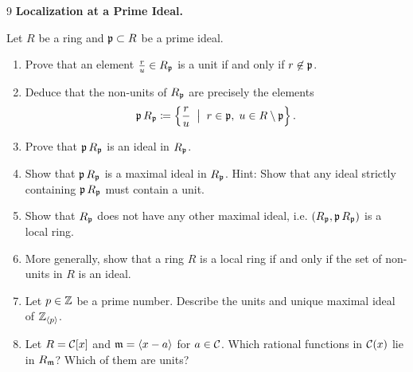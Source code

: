 \documentclass[Notebook.tex]{subfiles}
\begin{document}
\begin{problem}{9}
	\textbf{Localization at a Prime Ideal.} 
	
	Let $R$ be a ring and $\operatorname{\mathfrak{p}} \subset R$ be a prime ideal.
	\begin{enumerate}
		\item Prove that an element $\frac{r}{u} \in R_{\operatorname{\mathfrak{p}}}$ is a unit if and only if $r \not \in \operatorname{\mathfrak{p}}$.
		\item Deduce that the non-units of $R_{\operatorname{\mathfrak{p}}}$ are precisely the elements
		\[
		\operatorname{\mathfrak{p}} R_{\operatorname{\mathfrak{p}}} \coloneqq \left\{ \frac{r}{u} \;\; \big|\;\; r \in \operatorname{\mathfrak{p}},\; u\in R\setminus \operatorname{\mathfrak{p}}\right\}.
		\]
		\item Prove that $\operatorname{\mathfrak{p}} R_{\operatorname{\mathfrak{p}}}$ is an ideal in $R_{\operatorname{\mathfrak{p}}}$. 
		\item Show that $\operatorname{\mathfrak{p}} R_{\operatorname{\mathfrak{p}}}$ is a maximal ideal in $R_{\operatorname{\mathfrak{p}}}$. Hint: Show that any ideal strictly containing $\operatorname{\mathfrak{p}} R_{\operatorname{\mathfrak{p}}}$ must contain a unit.
		\item Show that $R_{\operatorname{\mathfrak{p}}}$ does not have any other maximal ideal, i.e. $(R_{\operatorname{\mathfrak{p}}}, \operatorname{\mathfrak{p}} R_{\operatorname{\mathfrak{p}}})$ is a local ring. 
		\item More generally, show that a ring $R$ is a local ring if and only if the set of non-units in $R$ is an ideal. 
		\item Let $p\in \mathbb Z$ be a prime number. Describe the units and unique maximal ideal of $\mathbb Z_{\langle p\rangle}$. 
		\item Let $R=\mathcal{C}[x]$ and $\operatorname{\mathfrak{m}} = \langle x-a\rangle$ for $a \in \mathcal{C}$.  Which rational functions in $\mathcal{C}(x)$ lie in $R_{\operatorname{\mathfrak{m}}}$? Which of them are units?
	\end{enumerate}
\end{problem}
\end{document}
